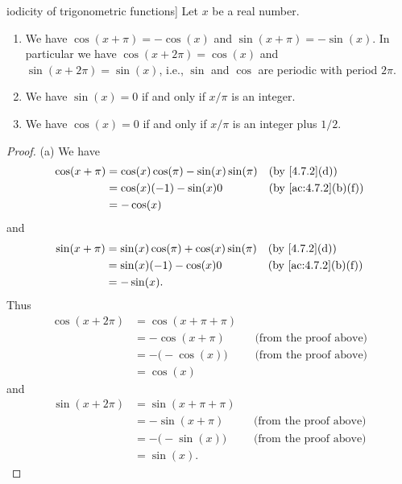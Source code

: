 \begin{thm}iodicity of trigonometric functions]\label{4.7.5}
  Let \(x\) be a real number.
  \begin{enumerate}
    \item We have \(\cos(x + \pi) = -\cos(x)\) and \(\sin(x + \pi) = -\sin(x)\).
          In particular we have \(\cos(x + 2\pi) = \cos(x)\) and \(\sin(x + 2\pi) = \sin(x)\), i.e., \(\sin\) and \(\cos\) are periodic with period \(2\pi\).
    \item We have \(\sin(x) = 0\) if and only if \(x / \pi\) is an integer.
    \item We have \(\cos(x) = 0\) if and only if \(x / \pi\) is an integer plus \(1 / 2\).
  \end{enumerate}
\end{thm}

\begin{proof}{(a)}
  We have
  \begin{align*}
    \cos(x + \pi) & = \cos(x) \cos(\pi) - \sin(x) \sin(\pi) &  & \text{(by \cref{4.7.2}(d))}       \\
                  & = \cos(x) (-1) - \sin(x) 0              &  & \text{(by \cref{ac:4.7.2}(b)(f))} \\
                  & = -\cos(x)
  \end{align*}
  and
  \begin{align*}
    \sin(x + \pi) & = \sin(x) \cos(\pi) + \cos(x) \sin(\pi) &  & \text{(by \cref{4.7.2}(d))}       \\
                  & = \sin(x) (-1) - \cos(x) 0              &  & \text{(by \cref{ac:4.7.2}(b)(f))} \\
                  & = -\sin(x).
  \end{align*}
  Thus
  \begin{align*}
    \cos(x + 2\pi) & = \cos(x + \pi + \pi)                                    \\
                   & = -\cos(x + \pi)      &  & \text{(from the proof above)} \\
                   & = -\big(-\cos(x)\big) &  & \text{(from the proof above)} \\
                   & = \cos(x)
  \end{align*}
  and
  \begin{align*}
    \sin(x + 2\pi) & = \sin(x + \pi + \pi)                                    \\
                   & = -\sin(x + \pi)      &  & \text{(from the proof above)} \\
                   & = -\big(-\sin(x)\big) &  & \text{(from the proof above)} \\
                   & = \sin(x).
  \end{align*}
\end{proof}

